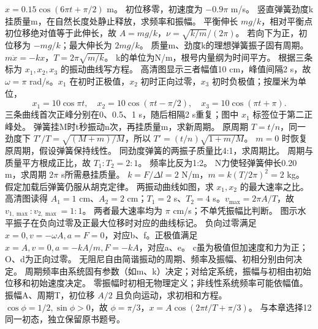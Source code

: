\workings $x=0.15\cos(6\pi t+\pi/2)$ m。
\crosscheck 初位移零，初速度为 $-0.9\pi$ m/s。
\problemtext 竖直弹簧劲度k挂质量m，在自然长度处静止释放，求频率和振幅。
\workings 平衡伸长 $mg/k$，相对平衡点初位移绝对值等于此伸长，故 $A=mg/k$，$\nu=\sqrt{k/m}/(2\pi)$。
\crosscheck 若向下为正，初位移为 $-mg/k$；最大伸长为 $2mg/k$。
\problemtext 质量m、劲度k的理想弹簧振子固有周期。
\workings $m\ddot x=-kx$，$T=2\pi\sqrt{m/k}$。
\crosscheck k的单位为N/m，根号内量纲为时间平方。
\problemtext 根据三条标为 $x_1,x_2,x_3$ 的振动曲线写方程。
\workings 高清图显示三者幅值10 cm，峰值间隔2 s，故 $\omega=\pi$ rad/s。$x_1$ 在初时正极值，$x_2$ 初时正向过零，$x_3$ 初时负极值；按厘米为单位，
\[
x_1=10\cos\pi t,\quad x_2=10\cos(\pi t-\pi/2),\quad x_3=10\cos(\pi t+\pi).
\]
\crosscheck 三条曲线首次正峰分别在0、0.5、1 s，随后相隔2 s重复；图中 $x_1$ 标签位于第二正峰处。
\problemtext 弹簧挂M时t秒振动n次，再挂质量m，求新周期。
\workings 原周期 $T=t/n$，同一劲度下 $T'/T=\sqrt{(M+m)/M}$，所以 $T'=(t/n)\sqrt{1+m/M}$。
\crosscheck $m=0$ 时恢复原周期，假设弹簧保持线性。
\problemtext 同劲度弹簧的两振子质量比4:1，求周期比。
\workings 周期与质量平方根成正比，故 $T_1:T_2=2:1$。
\crosscheck 频率比反为1:2。
 N力使轻弹簧伸长0.20 m，求周期 $2\pi$ s所需悬挂质量。
\workings $k=F/\Delta l=2$ N/m，$m=k(T/2\pi)^2=2$ kg。
\crosscheck 假定加载后弹簧仍服从胡克定律。
\problemtext 两振动曲线如图，求 $x_1,x_2$ 的最大速率之比。
\workings 高清图读得 $A_1=1$ cm、$A_2=2$ cm；$T_1=2$ s、$T_2=4$ s。$v_{\max}=2\pi A/T$，故 $v_{1,\max}:v_{2,\max}=1:1$。
\crosscheck 两者最大速率均为 $\pi$ cm/s；不单凭振幅比判断。
\problemtext 图示水平振子在负向过零及正最大位移时对应的曲线标记。
\workings 负向过零满足 $x=0,v=-\omega A,a=F=0$，对应b、f。正极值满足 $x=A,v=0,a=-kA/m,F=-kA$，对应a、e。
\crosscheck c虽为极值但加速度和力为正；O、d为正向过零。
\problemtext 无阻尼自由简谐振动的周期、频率及振幅、初相分别由何决定。
\workings 周期频率由系统固有参数（如m、k）决定；对给定系统，振幅与初相由初始位移和初始速度决定。
\crosscheck 零振幅时初相无物理定义；非线性系统频率可能依幅值。
\problemtext 振幅A、周期T，初位移 $A/2$ 且负向运动，求初相和方程。
\workings $\cos\phi=1/2,\sin\phi>0$，故 $\phi=\pi/3$，$x=A\cos(2\pi t/T+\pi/3)$。
\crosscheck 与本章选择12同一初态，独立保留原书题号。

